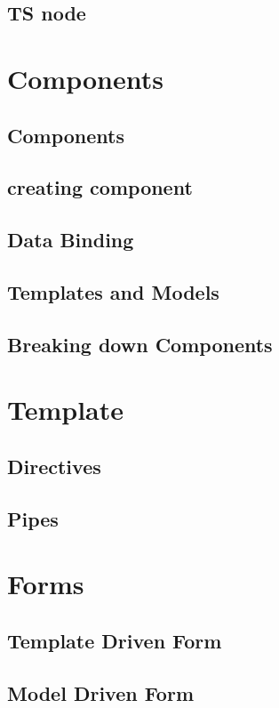 \documentclass[a4paper]{article}
\begin{document}
\subsection{TS node}

\section{Components}

\subsection{Components}
\subsection{creating component}
\subsection{Data Binding}
\subsection{Templates and Models}
\subsection{Breaking down Components}

\section{Template}
\subsection{Directives}
\subsection{Pipes}

\section{Forms}
\subsection{Template Driven Form}
\subsection{Model Driven Form}
\end{document}

